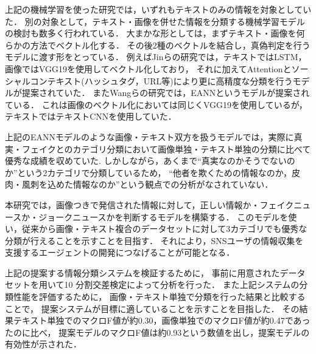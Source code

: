 上記の機械学習を使った研究では，いずれもテキストのみの情報を対象としていた．
別の対象として，テキスト・画像を併せた情報を分類する機械学習モデルの検討も数多く行われている．
大まかな形としては，まずテキスト・画像を何らかの方法でベクトル化する．
その後2種のベクトルを結合し，真偽判定を行うモデルに渡す形をとっている．
例えばJinらの研究\cite{Jin:2017:MFR:3123266.3123454}では，テキストではLSTM，画像ではVGG19を使用してベクトル化しており，
それに加えてAttentionとソーシャルコンテキスト(ハッシュタグ，URL等)により更に高精度な分類を行うモデルが提案されていた．
またWangらの研究\cite{Wang:2018:EEA:3219819.3219903}では，EANNというモデルが提案されている．
これは画像のベクトル化においては同じくVGG19を使用しているが，テキストではテキストCNNを使用していた．

上記のEANNモデルのような画像・テキスト双方を扱うモデルでは，実際に真実・フェイクとのカテゴリ分類において画像単独・テキスト単独の分類に比べて優秀な成績を収めていた\cite{Wang:2018:EEA:3219819.3219903}.\@
しかしながら，あくまで``真実なのかそうでないのか''という2カテゴリで分類しているため，
``他者を欺くための情報なのか，皮肉・風刺を込めた情報なのか''という観点での分析がなされていない．

本研究では，画像つきで発信された情報に対して，正しい情報か・フェイクニュースか・ジョークニュースかを判断するモデルを構築する．
このモデルを使い，従来から画像・テキスト複合のデータセットに対して3カテゴリでも優秀な分類が行えることを示すことを目指す．
それにより，SNSユーザの情報収集を支援するエージェントの開発につなげることが可能となる．

上記の提案する情報分類システムを検証するために，
事前に用意されたデータセットを用いて10 分割交差検定によって分析を行った．
また上記システムの分類性能を評価するために，
画像・テキスト単独で分類を行った結果と比較することで，
提案システムが目標に適していることを示すことを目指した．
その結果テキスト単独でのマクロF値が約0.30，画像単独でのマクロF値が約0.47であったのに比べ，
提案モデルのマクロF値は約0.93という数値を出し，提案モデルの有効性が示された．
